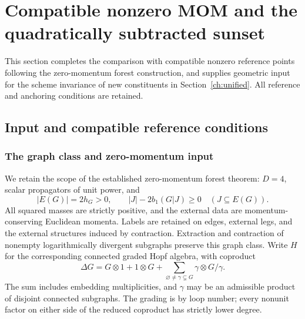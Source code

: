 \documentclass[11pt,a4paper,oneside]{article}
\theoremstyle{plain}
\theoremstyle{definition}
\theoremstyle{remark}
\newcommand{\Q}{\mathbb Q}
\numberwithin{equation}{section}
\begin{document}
\endgroup



\section{Compatible nonzero MOM and the quadratically subtracted sunset}\label{ch:finitemom}\label{ch:sunsetjet}

\begingroup

This section completes the comparison with compatible nonzero reference points following the zero-momentum forest construction, and supplies geometric input for the scheme invariance of new constituents in Section~\ref{ch:unified}. All reference and anchoring conditions are retained.

\providecommand{\Q}{\mathbb Q}
\providecommand{\cP}{\mathcal P}
\providecommand{\cC}{\mathcal C}
\providecommand{\ev}{\operatorname{ev}}
\providecommand{\per}{\operatorname{per}}
\providecommand{\eps}{\varepsilon_H}

\subsection{Input and compatible reference conditions}
\subsubsection{The graph class and zero-momentum input}
We retain the scope of the established zero-momentum forest theorem: $D=4$, scalar propagators of unit power, and
\begin{equation}\label{finitemom:eq:class}
 |E(G)|=2h_G>0,\qquad |J|-2b_1(G|J)\geq0\quad(J\subseteq E(G)).
\end{equation}
All squared masses are strictly positive, and the external data are momentum-conserving Euclidean momenta.
Labels are retained on edges, external legs, and the external structures induced by contraction.
Extraction and contraction of nonempty logarithmically divergent subgraphs preserve this graph class.
Write $H$ for the corresponding connected graded Hopf algebra, with coproduct
\begin{equation}\label{finitemom:eq:coproduct}
 \Delta G=G\otimes1+1\otimes G+
       \sum_{\varnothing\ne\gamma\subsetneq G}\gamma\otimes G/\gamma.
\end{equation}
The sum includes embedding multiplicities, and $\gamma$ may be an admissible product of disjoint connected subgraphs.
The grading is by loop number; every nonunit factor on either side of the reduced coproduct has strictly lower degree.
\end{document}
